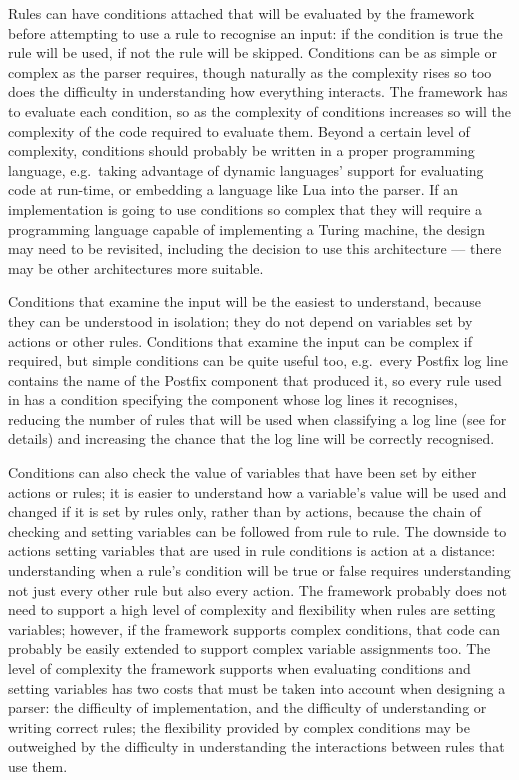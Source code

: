 \label{rule conditions in architecture}

Rules can have conditions attached that will be evaluated by the framework
before attempting to use a rule to recognise an input: if the condition is
true the rule will be used, if not the rule will be skipped.  Conditions
can be as simple or complex as the parser requires, though naturally as the
complexity rises so too does the difficulty in understanding how everything
interacts.  The framework has to evaluate each condition, so as the
complexity of conditions increases so will the complexity of the code
required to evaluate them.  Beyond a certain level of complexity,
conditions should probably be written in a proper programming language,
e.g.\ taking advantage of dynamic languages' support for evaluating code at
run-time, or embedding a language like Lua into the parser.  If an
implementation is going to use conditions so complex that they will require
a programming language capable of implementing a Turing machine, the design
may need to be revisited, including the decision to use this architecture
--- there may be other architectures more suitable.

Conditions that examine the input will be the easiest to understand,
because they can be understood in isolation; they do not depend on
variables set by actions or other rules.  Conditions that examine the input
can be complex if required, but simple conditions can be quite useful too,
e.g.\ every Postfix log line contains the name of the Postfix component
that produced it, so every rule used in \parsername{} has a condition
specifying the component whose log lines it recognises, reducing the number
of rules that will be used when classifying a log line (see
 for details) and increasing the chance
that the log line will be correctly recognised.

Conditions can also check the value of variables that have been set by
either actions or rules; it is easier to understand how a variable's value
will be used and changed if it is set by rules only, rather than by
actions, because the chain of checking and setting variables can be
followed from rule to rule.  The downside to actions setting variables that
are used in rule conditions is action at a distance: understanding when a
rule's condition will be true or false requires understanding not just
every other rule but also every action.  The framework probably does not
need to support a high level of complexity and flexibility when rules are
setting variables; however, if the framework supports complex conditions,
that code can probably be easily extended to support complex variable
assignments too.  The level of complexity the framework supports when
evaluating conditions and setting variables has two costs that must be
taken into account when designing a parser: the difficulty of
implementation, and the difficulty of understanding or writing correct
rules; the flexibility provided by complex conditions may be outweighed by
the difficulty in understanding the interactions between rules that use
them.

